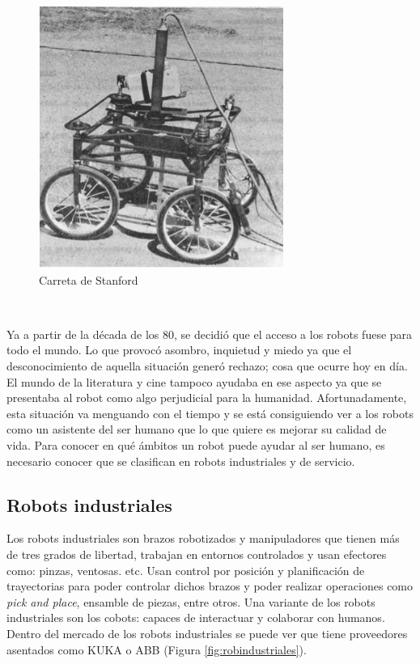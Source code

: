 \begin{figure} [h!]
	\begin{center}
		\includegraphics[width=8cm]{figs/stanford.png}
	\end{center}
	\caption{Carreta de Stanford \cite{earnest2012stanfordcart}}
	\label{fig:stanford}
\end{figure}\


Ya a partir de la década de los 80, se decidió que el acceso a los robots fuese para todo el mundo. Lo que provocó asombro, inquietud y miedo ya que el desconocimiento de aquella situación generó rechazo; cosa que ocurre hoy en día. El mundo de la literatura y cine tampoco ayudaba en ese aspecto ya que se presentaba al robot como algo perjudicial para la humanidad. Afortunadamente, esta situación va menguando con el tiempo y se está consiguiendo ver a los robots como un asistente del ser humano que lo que quiere es mejorar su calidad de vida. Para conocer en qué ámbitos un robot puede ayudar al ser humano, es necesario conocer que se clasifican en robots industriales y de servicio. \\


\subsection{Robots industriales}

Los robots industriales son brazos robotizados y manipuladores que tienen más de tres grados de libertad, trabajan en entornos controlados y usan efectores como: pinzas, ventosas. etc. Usan control por posición y planificación de trayectorias para poder controlar dichos brazos y poder realizar operaciones como \textit{pick and place}, ensamble de piezas, entre otros. Una variante de los robots industriales son los cobots: capaces de interactuar y colaborar con humanos. Dentro del mercado de los robots industriales se puede ver que tiene proveedores asentados como KUKA o ABB (Figura \ref{fig:robindustriales}).


